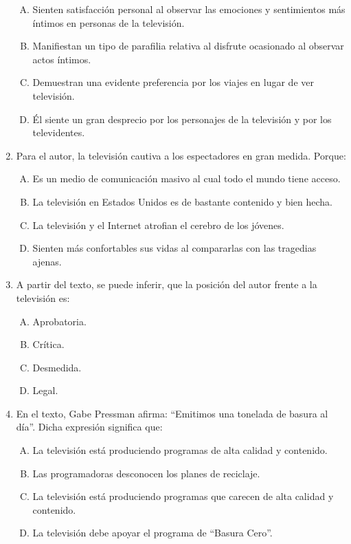 \begin{enumerate}
\begin{enumerate}[(A)]
\item Sienten satisfacción personal al observar las emociones y sentimientos más íntimos en personas de la televisión.
\item Manifiestan un tipo de parafilia relativa al disfrute ocasionado al observar actos íntimos.
\item Demuestran una evidente preferencia por los viajes en lugar de ver televisión.
\item Él siente un gran desprecio por los personajes de la televisión y por los televidentes.
\end{enumerate}
\item Para el autor, la televisión cautiva a los espectadores en gran medida. Porque: \label{lit-12}

\begin{enumerate}[(A)]
\item Es un medio de comunicación masivo al cual todo el mundo tiene acceso.
\item La televisión en Estados Unidos es de bastante contenido y bien hecha.
\item La televisión y el Internet atrofian el cerebro de los jóvenes.
\item Sienten más confortables sus vidas al compararlas con las tragedias ajenas. 
\end{enumerate}
\item A partir del texto, se puede inferir, que la posición del autor frente a la televisión es: \label{lit-13}

\begin{enumerate}[(A)]
\item Aprobatoria.
\item Crítica.
\item Desmedida.
\item Legal.
\end{enumerate}
\newpage
\item En el texto, Gabe Pressman afirma: ``Emitimos una tonelada de basura al día''. Dicha expresión significa que: \label{lit-14}


\begin{enumerate}[(A)]
\item La televisión está produciendo programas de alta calidad y contenido.
\item Las programadoras desconocen los planes de reciclaje.
\item La televisión está produciendo programas que carecen de alta calidad y contenido.
\item La televisión debe apoyar el programa de ``Basura Cero''.
\end{enumerate}




\end{enumerate}
